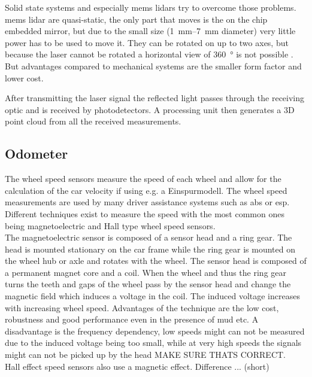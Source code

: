 Solid state systems and especially \gls{mems} \gls{lidar}s try to overcome those problems.
\gls{mems} \gls{lidar} are quasi-static, the only part that moves is the on the chip embedded mirror, but due to the small size (\SIrange{1}{7}{\milli\metre} diameter) very little power has to be used to move it.
They can be rotated on up to two axes, but because the laser cannot be rotated a horizontal view of \SI{360}{\degree} is not possible .
But advantages compared to mechanical systems are the smaller form factor and lower cost.

After transmitting the laser signal the reflected light passes through the receiving optic and is received by photodetectors.
A processing unit then generates a 3D point cloud from all the received measurements.
\cite{Wang2020}
\cite{Vaughan2006}


\subsection{Odometer}
The wheel speed sensors measure the speed of each wheel and allow for the calculation of the car velocity if using e.g. a Einspurmodell.
The wheel speed measurements are used by many driver assistance systems such as \gls{abs} or \gls{esp}.
Different techniques exist to measure the speed with the most common ones being magnetoelectric and Hall type wheel speed sensors.\\
The magnetoelectric sensor is composed of a sensor head and a ring gear.
The head is mounted stationary on the car frame while the ring gear is mounted on the wheel hub or axle and rotates with the wheel.
The sensor head is composed of a permanent magnet core and a coil.
When the wheel and thus the ring gear turns the teeth and gaps of the wheel pass by the sensor head and change the magnetic field which induces a voltage in the coil.
The induced voltage increases with increasing wheel speed.
Advantages of the technique are the low cost, robustness and good performance even in the presence of mud etc.
A disadvantage is the frequency dependency, low speeds might can not be measured due to the induced voltage being too small, while at very high speeds the signals might can not be picked up by the head MAKE SURE THATS CORRECT.\\
Hall effect speed sensors also use a magnetic effect.
Difference ... (short)
\cite{AutoReif2014}



